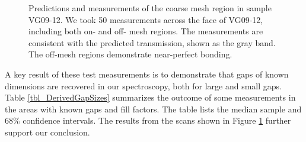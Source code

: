 \begin{figure}[htbp]
    \centering
    \newline
	\caption[Spatially resolved near-IR spectroscopy of direct bonded Si optics- measurements consistent with prediction band]{Predictions and measurements of the coarse mesh region in sample VG09-12.  We took 50 measurements across the face of VG09-12, including both on- and off- mesh regions.  The measurements are consistent with the predicted transmission, shown as the gray band.  The off-mesh regions demonstrate near-perfect bonding.}
	\label{figVG12}
\end{figure}

A key result of these test measurements is to demonstrate that gaps of known dimensions are recovered in our spectroscopy, both for large and small gaps.  Table \ref{tbl_DerivedGapSizes} summarizes the outcome of some measurements in the areas with known gaps and fill factors.  The table lists the median sample and 68\% confidence intervals.  The results from the scans shown in Figure \ref{figVG12} further support our conclusion.


